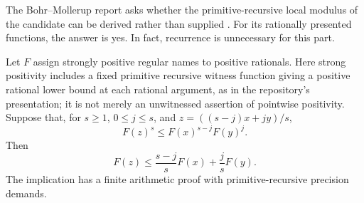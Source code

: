 The Bohr--Mollerup report asks whether the primitive-recursive local
modulus of the candidate can be derived rather than supplied
\cite{repo-bm}.  For its rationally presented functions, the answer is
yes.  In fact, recurrence is unnecessary for this part.

\begin{lemma}
\label{lem:positive-convexity}
Let $F$ assign strongly positive regular names to positive rationals.
Here strong positivity includes a fixed primitive recursive witness
function giving a positive rational lower bound at each rational
argument, as in the repository's presentation; it is not merely an
unwitnessed assertion of pointwise positivity.
Suppose that, for $s\ge1$, $0\le j\le s$, and
$z=((s-j)x+jy)/s$,
\begin{equation}
 F(z)^s\le F(x)^{s-j}F(y)^j.
 \label{eq:rlc-framework}
\end{equation}
Then
\[
 F(z)\le\frac{s-j}{s}F(x)+\frac{j}{s}F(y).
\]
The implication has a finite arithmetic proof with
primitive-recursive precision demands.
\end{lemma}

